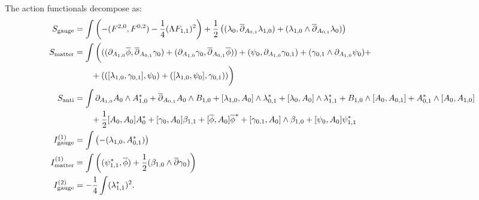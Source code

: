 \documentclass[10pt, oneside]{article}
\begin{document}

The action functionals decompose as:
\begin{align*}
S_{\mathrm{gauge}} &= \int \left(-(F^{2, 0}, F^{0, 2}) - \frac{1}{4}(\Lambda F_{1, 1})^2\right) + \frac 12 \left((\lambda_0 , \overline{\partial}_{A_{0,1}} \lambda_{1,0}) +(\lambda_{1,0} \wedge \overline{\partial}_{A_{0,1}} \lambda_{0})  \right)  \\
S_{\mathrm{matter}} &= \int \bigg( ((\partial_{A_{1,0}}\overline{\phi} , \overline{\partial}_{A_{0,1}} \gamma_0) + (\partial_{A_{1,0}}\gamma_0, \overline{\partial}_{A_{0,1}} \overline{\phi})) + (\psi_0 , \partial_{A_{1,0}} \gamma_{0,1}) + (\gamma_{0,1} \wedge \partial_{A_{1,0}} \psi_{0})  + \\
&\qquad + (([\lambda_{1,0},\gamma_{0,1}],\psi_0) + ([\lambda_{1,0}, \psi_0], \gamma_{0,1}) )   \bigg) \\
S_{\mathrm{anti}} &= \int \partial_{A_{1, 0}} A_0 \wedge A_{1,0}^* + \overline{\partial}_{A_{0, 1}} A_0\wedge B_{1,0} + [\lambda_{1,0}, A_0]\wedge \lambda_{0,1}^* +  [\lambda_{0}, A_0]\wedge \lambda_{1,1}^* +B_{1,0} \wedge [A_0, A_{0,1}] + A_{0,1}^* \wedge [A_{0}, A_{1,0}] \\
&\qquad + \frac{1}{2}[A_0, A_0]A_0^* + [\gamma_0, A_0] \beta_{1,1} + [\overline{\phi}, A_0] \overline{\phi}^* + [\gamma_{0,1}, A_0]\wedge \beta_{1,0} + [\psi_0, A_0] \psi_{1,1}^* \\
I^{(1)}_{\mathrm{gauge}} &=  \int \left( - (\lambda_{1,0}, A_{0,1}^*) \right)\\
I^{(1)}_{\mathrm{matter}} &=  \int \left( (\psi_{1,1}^*, \overline{\phi}) + \frac 12(\beta_{1,0} \wedge \overline{\partial} \gamma_0) \right)\\
I^{(2)}_{\mathrm{gauge}} &= -\frac{1}{4}\int (\lambda_{1,1}^*)^2.
\end{align*}
\end{document}
